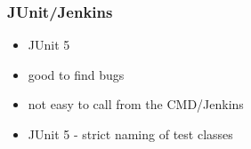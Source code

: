 	\begin{frame}[fragile=singleslide]
			\frametitle{JUnit/Jenkins}
	\begin{itemize}
		\item JUnit 5
		\item good to find bugs
		\item not easy to call from the CMD/Jenkins
		\item JUnit 5 - strict naming of test classes
	\end{itemize}
  \end{frame}